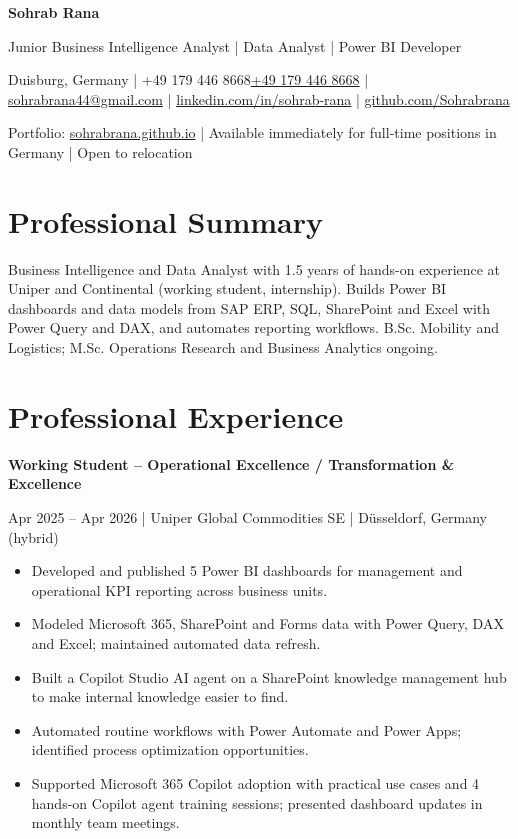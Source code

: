 \documentclass[10pt,a4paper]{article}
\makeatletter
\newcommand{\cvname}{Sohrab Rana}
\newcommand{\cvheadline}{Junior Business Intelligence Analyst | Data Analyst | Power BI Developer}
\newcommand{\cvlocation}{Duisburg, Germany}
\def\cvphone{+49 179 446 8668}
\def\cvphonelink{+491794468668}
\newcommand{\cvemail}{sohrabrana44@gmail.com}
\newcommand{\cvlinkedin}{linkedin.com/in/sohrab-rana}
\newcommand{\cvgithub}{github.com/Sohrabrana}
\newcommand{\cvportfolio}{sohrabrana.github.io}
\newcommand{\role}[4]{%
  \vspace{0.22em}%
  {\bfseries #1}\par
  {\color{muted}#2} | {\color{accent}#3} | {\color{muted}#4}\par}
\makeatother
\begin{document}
{\fontsize{23}{26}\selectfont\bfseries \cvname\par}
\vspace{0.15em}
{\large\color{accent} \cvheadline\par}
\vspace{0.3em}
{\small
\cvlocation{} | \ifx\cvphone\empty\else\href{tel:\cvphonelink}{\cvphone} | \fi\href{mailto:\cvemail}{\cvemail} | \href{https://www.\cvlinkedin}{\cvlinkedin} | \href{https://\cvgithub}{\cvgithub}\par
\vspace{0.12em}
Portfolio: \href{https://\cvportfolio}{\cvportfolio} | Available immediately for full-time positions in Germany | Open to relocation\par}

\section{Professional Summary}
Business Intelligence and Data Analyst with 1.5 years of hands-on experience at Uniper and Continental (working student, internship). Builds Power BI dashboards and data models from SAP ERP, SQL, SharePoint and Excel with Power Query and DAX, and automates reporting workflows. B.Sc. Mobility and Logistics; M.Sc. Operations Research and Business Analytics ongoing.

\section{Professional Experience}

\role{Working Student – Operational Excellence / Transformation \& Excellence}{Apr 2025 – Apr 2026}
     {Uniper Global Commodities SE}{Düsseldorf, Germany (hybrid)}
\begin{itemize}
  \item Developed and published 5 Power BI dashboards for management and operational KPI reporting across business units.
  \item Modeled Microsoft 365, SharePoint and Forms data with Power Query, DAX and Excel; maintained automated data refresh.
  \item Built a Copilot Studio AI agent on a SharePoint knowledge management hub to make internal knowledge easier to find.
  \item Automated routine workflows with Power Automate and Power Apps; identified process optimization opportunities.
  \item Supported Microsoft 365 Copilot adoption with practical use cases and 4 hands-on Copilot agent training sessions; presented dashboard updates in monthly team meetings.
\end{itemize}
\end{document}
